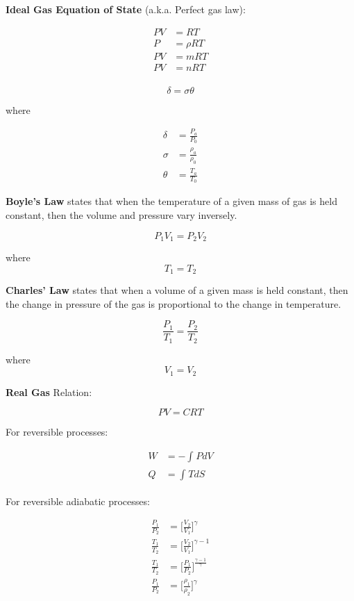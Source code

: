\documentclass[
]{book}
\begin{document}
\textbf{Ideal Gas Equation of State} (a.k.a. Perfect gas law):

\begin{align}
PV&=RT\\
P &= \rho RT\\
PV &= mRT\\
PV &= nRT\\
\end{align}

\[\delta = \sigma \theta\]

where

\begin{align}
\delta &= \frac{P_a}{P_0}\\
\sigma &= \frac{\rho_a}{\rho_0}\\
\theta &= \frac{T_a}{T_0}
\end{align}

\textbf{Boyle's Law} states that when the temperature of a given mass of gas is held constant, then the volume and pressure vary inversely.

\[P_1 V_1 = P_2 V_2\]

where \[T_1 = T_2\]

\textbf{Charles' Law} states that when a volume of a given mass is held constant, then the change in pressure of the gas is proportional to the change in temperature.

\[\frac{P_1}{T_1} = \frac{P_2}{T_2}\]

where \[V_1 = V_2\]

\textbf{Real Gas} Relation:

\[PV = CRT\]

For reversible processes:

\begin{align}
W &= −\int_{}^{}{PdV}\\
Q &= \int_{}^{}{TdS}
\end{align}

For reversible adiabatic processes:

\begin{align}
\frac{P_1}{P_2} &= \Bigg[ \frac{V_2}{V_1} \Bigg]^{\gamma} \\
\frac{T_1}{T_2} &= \Bigg[ \frac{V_2}{V_1} \Bigg]^{\gamma - 1} \\
\frac{T_1}{T_2} &= \Bigg[ \frac{P_1}{P_2} \Bigg]^{\frac{\gamma - 1}{\gamma}} \\
\frac{P_1}{P_2} &= \Bigg[ \frac{\rho_1}{\rho_2} \Bigg]^{\gamma} \\
\end{align}
\end{document}
